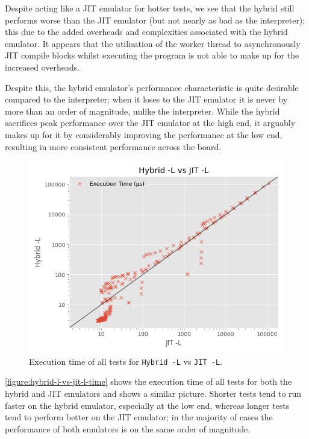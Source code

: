 Despite acting like a JIT emulator for hotter tests, we see that the hybrid still performs worse than the JIT emulator (but not nearly as bad as the interpreter); this due to the added overheads and complexities associated with the hybrid emulator. It appears that the utilisation of the worker thread to asynchronously JIT compile blocks whilst executing the program is not able to make up for the increased overheads.

Despite this, the hybrid emulator's performance characteristic is quite desirable compared to the interpreter; when it loses to the JIT emulator it is never by more than an order of magnitude, unlike the interpreter. While the hybrid sacrifices peak performance over the JIT emulator at the high end, it arguably makes up for it by considerably improving the performance at the low end, resulting in more consistent performance across the board.

\begin{figure}[H]
    \centering
    \includegraphics[scale=0.75]{output/graphs/scatter/vs/JIT -L-vs-Hybrid -L-time.png}
    \caption{Execution time of all tests for \texttt{Hybrid -L} vs \texttt{JIT -L}.}
    \label{figure:hybrid-l-vs-jit-l-time}
\end{figure}

\autoref{figure:hybrid-l-vs-jit-l-time} shows the execution time of all tests for both the hybrid and JIT emulators and shows a similar picture. Shorter tests tend to run faster on the hybrid emulator, especially at the low end, whereas longer tests tend to perform better on the JIT emulator; in the majority of cases the performance of both emulators is on the same order of magnitude.

